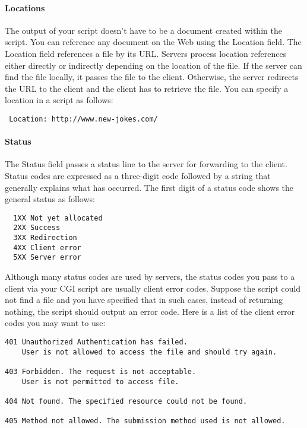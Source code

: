 \paragraph{Locations}

The output of your script doesn't have to be a document created within the
script. You can reference any document on the Web using the Location
field. The Location field references a file by its URL. Servers process
location references either directly or indirectly depending on the
location of the file. If the server can find the file locally, it passes
the file to the client. Otherwise, the server redirects the URL to the
client and the client has to retrieve the file. You can specify a location
in a script as follows:

\begin{verbatim}
 Location: http://www.new-jokes.com/
\end{verbatim}


\paragraph{Status}

The Status field passes a status line to the server for forwarding to the
client. Status codes are expressed as a three-digit code followed by a
string that generally explains what has occurred. The first digit of a
status code shows the general status as follows:

\begin{verbatim}
  1XX Not yet allocated
  2XX Success
  3XX Redirection
  4XX Client error
  5XX Server error
\end{verbatim}

Although many status codes are used by servers, the status codes you pass
to a client via your CGI script are usually client error codes. Suppose
the script could not find a file and you have specified that in such
cases, instead of returning nothing, the script should output an error
code. Here is a list of the client error codes you may want to use:

\begin{verbatim}
401 Unauthorized Authentication has failed. 
    User is not allowed to access the file and should try again.

403 Forbidden. The request is not acceptable. 
    User is not permitted to access file.

404 Not found. The specified resource could not be found.

405 Method not allowed. The submission method used is not allowed.
\end{verbatim}
